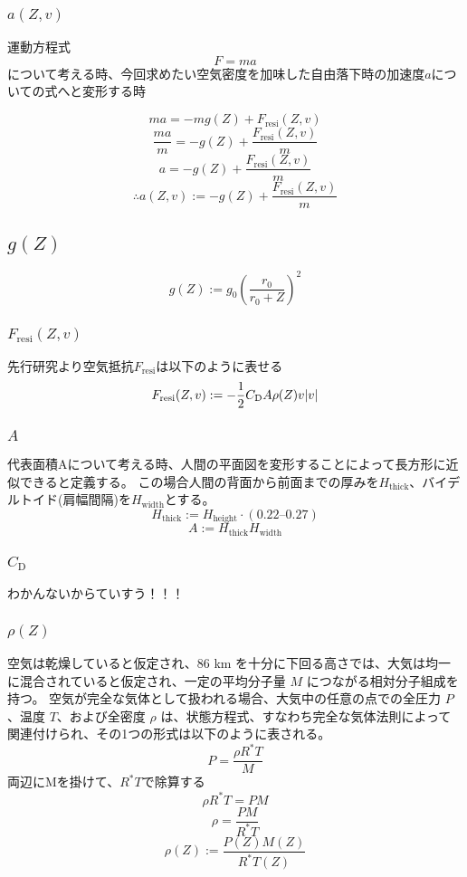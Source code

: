 \documentclass[a4paper,12pt]{article}
\begin{document}
\subsubsection{$a(Z, v)$}
運動方程式
\[
  F = ma
\]
について考える時、今回求めたい空気密度を加味した自由落下時の加速度$a$についての式へと変形する時

\[
  ma = -mg(Z) + F_{\mathrm{resi}}(Z, v)
\]
\[
  \frac{ma}{m} = -g(Z) + \frac{F_{\mathrm{resi}}(Z, v)}{m}
\]
\[
  a = -g(Z) + \frac{F_{\mathrm{resi}}(Z, v)}{m}
\]
\[
  \therefore a(Z, v) := -g(Z) + \frac{F_{\mathrm{resi}}(Z, v)}{m}
\]

\subsection{$g(Z)$}

\[
  g(Z) := g_0\left(\frac{r_0}{r_0+Z}\right)^2
\]
\subsubsection{$F_{\mathrm{resi}}(Z, v)$}
先行研究より空気抵抗$F_{\mathrm{resi}}$は以下のように表せる
\[
  F_{\mathrm{resi}}(Z, v) := -\frac{1}{2}C_{\mathrm{D}}A\rho(Z)v\abs{v}
\]

\subsubsection{$A$}
代表面積Aについて考える時、人間の平面図を変形することによって長方形に近似できると定義する。
この場合人間の背面から前面までの厚みを$H_{\mathrm{thick}}$、バイデルトイド(肩幅間隔)を$H_{\mathrm{width}}$とする。
\[
H_{\mathrm{thick}} := H_{\mathrm{height}} \cdot (0.22 \text{--} 0.27)
\]
\[
A := H_{\mathrm{thick}} H_{\mathrm{width}}
\]

\subsubsection{$C_{\mathrm{D}}$}
わかんないからていすう！！！ %


\subsubsection{$\rho(Z)$}
空気は乾燥していると仮定され、86 km を十分に下回る高さでは、大気は均一に混合されていると仮定され、一定の平均分子量 $M$ につながる相対分子組成を持つ。
空気が完全な気体として扱われる場合、大気中の任意の点での全圧力 $P$、温度 $T$、および全密度 $\rho$ は、状態方程式、すなわち完全な気体法則によって関連付けられ、その1つの形式は以下のように表される。
\[
P = \frac{\rho R^* T}{M}
\]
両辺にMを掛けて、$R^*T$で除算する
\[
\rho R^* T = PM
\]
\[
  \rho = \frac{P M}{R^* T}
\]
\[
  \rho(Z) := \frac{P(Z) M(Z)}{R^* T(Z)}
\]
\end{document}
